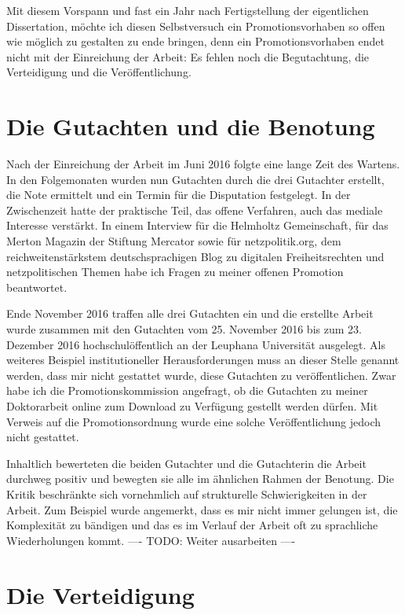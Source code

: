 Mit diesem Vorspann und fast ein Jahr nach Fertigstellung der eigentlichen Dissertation, möchte ich diesen Selbstversuch ein Promotionsvorhaben so offen wie möglich zu gestalten zu ende bringen, denn ein Promotionsvorhaben endet nicht mit der Einreichung der Arbeit: Es fehlen noch die Begutachtung, die Verteidigung und die Veröffentlichung.

\section{Die Gutachten und die Benotung}

Nach der Einreichung der Arbeit im Juni 2016 folgte eine lange Zeit des Wartens. In den Folgemonaten wurden nun Gutachten durch die drei Gutachter erstellt, die Note ermittelt und ein Termin für die Disputation festgelegt. In der Zwischenzeit hatte der praktische Teil, das offene Verfahren, auch das mediale Interesse verstärkt. In einem Interview für die Helmholtz Gemeinschaft, für das Merton Magazin der Stiftung Mercator sowie für netzpolitik.org, dem reichweitenstärkstem deutschsprachigen Blog zu digitalen Freiheitsrechten und netzpolitischen Themen habe ich Fragen zu meiner offenen Promotion beantwortet.

Ende November 2016 traffen alle drei Gutachten ein und die erstellte Arbeit wurde zusammen mit den Gutachten vom 25. November 2016 bis zum 23. Dezember 2016 hochschulöffentlich an der Leuphana Universität ausgelegt. Als weiteres Beispiel institutioneller Herausforderungen muss an dieser Stelle genannt werden, dass mir nicht gestattet wurde, diese Gutachten zu veröffentlichen. Zwar habe ich die Promotionskommission angefragt, ob die Gutachten zu meiner Doktorarbeit online zum Download zu Verfügung gestellt werden dürfen. Mit Verweis auf die Promotionsordnung wurde eine solche Veröffentlichung jedoch nicht gestattet.

Inhaltlich bewerteten die beiden Gutachter und die Gutachterin die Arbeit durchweg positiv und bewegten sie alle im ähnlichen Rahmen der Benotung. Die Kritik beschränkte sich vornehmlich auf strukturelle Schwierigkeiten in der Arbeit. Zum Beispiel wurde angemerkt, dass es mir nicht immer gelungen ist, die Komplexität zu bändigen und das es im Verlauf der Arbeit oft zu sprachliche Wiederholungen kommt. ---- TODO: Weiter ausarbeiten ----

\section{Die Verteidigung}

